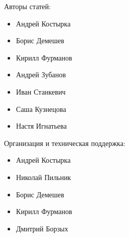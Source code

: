 \documentclass[12pt]{article}
\begin{document}
\pagestyle{empty}




Авторы статей:

\begin{itemize}
\item Андрей Костырка
\item Борис Демешев
\item Кирилл Фурманов
\item Андрей Зубанов
\item Иван Станкевич
\item Саша Кузнецова 
\item Настя Игнатьева
\end{itemize}


Организация и техническая поддержка:

\begin{itemize}
\item Андрей Костырка 
\item Николай Пильник 
\item Борис Демешев 
\item Кирилл Фурманов 
\item Дмитрий Борзых
\end{itemize}
\end{document}
